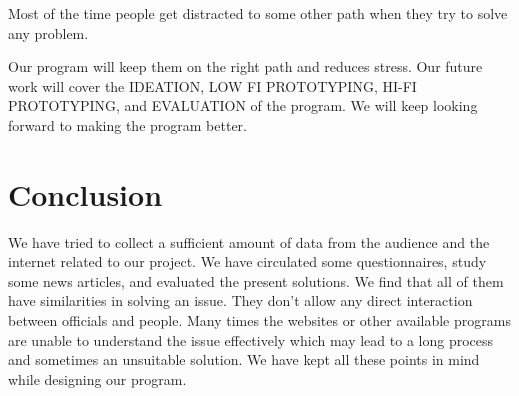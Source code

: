 \documentclass[acmtog]{acmart}
\begin{document}
\noindent Most of the time people get distracted to some other path when they try to solve any problem.

\noindent Our program will keep them on the right path and reduces stress. Our future work will cover the IDEATION, LOW FI PROTOTYPING, HI-FI PROTOTYPING, and EVALUATION of the program. We will keep looking forward to making the program better.

\section*{Conclusion}
We have tried to collect a sufficient amount of data from the audience and the internet related to our project. We have circulated some questionnaires, study some news articles, and evaluated the present solutions. We find that all of them have similarities in solving an issue. They don’t allow any direct interaction between officials and people. Many times the websites or other available programs are unable to understand the issue effectively which may lead to a long process and sometimes an unsuitable solution. We have kept all these points in mind while designing our program.
\end{document}
